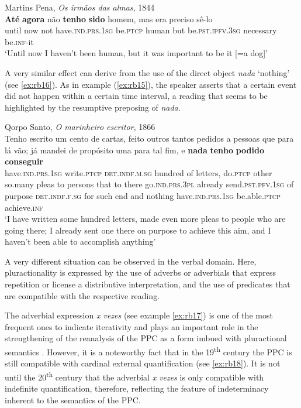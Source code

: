 \documentclass[output=paper,colorlinks,citecolor=brown]{langscibook}
\begin{document}
\ea\label{ex:rb15}
Martins Pena, \textit{Os irmãos das almas}, 1844\\
\gll \textbf{Até} \textbf{agora} não \textbf{tenho} \textbf{sido} homem, mas era preciso sê-lo\\
until now not have.\textsc{ind.prs.1sg} be.\textsc{ptcp} human but be.\textsc{pst.ipfv.3sg} necessary be.\textsc{inf}-it\\
\glt ‘Until now I haven’t been human, but it was important to be it [=a dog]’
\z

A very similar effect can derive from the use of the direct object \textit{nada} ‘nothing’ (see \ref{ex:rb16}). As in example (\ref{ex:rb15}), the speaker asserts that a certain event did not happen within a certain time interval, a reading that seems to be highlighted by the resumptive preposing \parencite[908--911]{Leonetti2017} of \textit{nada}. 

 
\ea\label{ex:rb16}
Qorpo Santo, \textit{O marinheiro escritor}, 1866\\
\gll Tenho escrito um cento de cartas, feito outros tantos pedidos a pessoas que para lá vão; já mandei de propósito uma para tal fim, e \textbf{nada} \textbf{tenho} \textbf{podido} \textbf{conseguir}\\
have.\textsc{ind.prs.1sg} write.\textsc{ptcp} \textsc{det.indf.m.sg} hundred of letters, do.\textsc{ptcp} other so.many pleas to persons that to there go.\textsc{ind.prs.3pl} already send.\textsc{pst.pfv.1sg} of purpose \textsc{det.indf.f.sg} for such end and nothing have.\textsc{ind.prs.1sg} be.able.\textsc{ptcp} achieve.\textsc{inf}\\
\glt ‘I have written some hundred letters, made even more pleas to people who are going there; I already sent one there on purpose to achieve this aim, and I haven’t been able to accomplish anything’
\z

A very different situation can be observed in the verbal domain. Here, pluractionality is expressed by the use of adverbs or adverbials that express repetition or license a distributive interpretation, and the use of predicates that are compatible with the respective reading. 

The adverbial expression \textit{x vezes} (see example \ref{ex:rb17}) is one of the most frequent ones to indicate iterativity and plays an important role in the strengthening of the reanalysis of the PPC as a form imbued with pluractional semantics \parencite[169, 181]{Becker2020}. However, it is a noteworthy fact that in the 19\textsuperscript{th} century the PPC is still compatible with cardinal external quantification (see \ref{ex:rb18}). It is not until the 20\textsuperscript{th} century that the adverbial \textit{x vezes} is only compatible with indefinite quantification, therefore, reflecting the feature of indeterminacy inherent to the semantics of the PPC.
\end{document}
